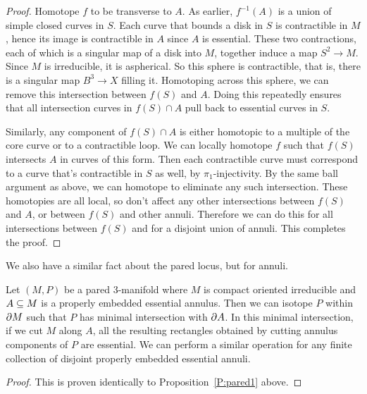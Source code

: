 \begin{proof}

Homotope $f$ to be transverse to $A$. As earlier, $f^{-1}(A)$ is a union of
simple closed curves in $S$. Each curve that bounds a disk in $S$ is
contractible in $M$, hence its image is contractible in $A$ since $A$ is
essential.  These two contractions, each of which is a singular map of a disk
into $M$, together induce a map $S^2 \to M$. Since $M$ is irreducible, it is
aspherical. So this sphere is contractible, that is, there is a singular map
$B^3 \to X$ filling it. Homotoping across this sphere, we can remove this
intersection between $f(S)$ and $A$. Doing this repeatedly ensures that all
intersection curves in $f(S) \cap A$ pull back to essential curves in $S$.

Similarly, any component of $f(S) \cap A$ is either homotopic to a multiple of
the core curve or to a contractible loop. We can locally homotope $f$ such that
$f(S)$ intersects $A$ in curves of this form. Then each contractible curve must
correspond to a curve that's contractible in $S$ as well, by
$\pi_1$-injectivity.  By the same ball argument as above, we can homotope to
eliminate any such intersection. These homotopies are all local, so don't
affect any other intersections between $f(S)$ and $A$, or between $f(S)$ and
other annuli. Therefore we can do this for all intersections between $f(S)$ and
for a disjoint union of annuli. This completes the proof.

\end{proof}

We also have a similar fact about the pared locus, but for annuli.

\begin{prop}

Let $(M,P)$ be a pared 3-manifold where $M$ is compact oriented irreducible and
$A \subseteq M$ is a properly embedded essential annulus. Then we can isotope $P$
within $\partial M$ such that $P$ has minimal intersection with $\partial A$.  In this
minimal intersection, if we cut $M$ along $A$, all the resulting rectangles
obtained by cutting annulus components of $P$ are essential.  We can perform
a similar operation for any finite collection of disjoint properly embedded
essential annuli.

\end{prop}

\begin{proof}

This is proven identically to Proposition~\ref{P:pared1} above.

\end{proof}

